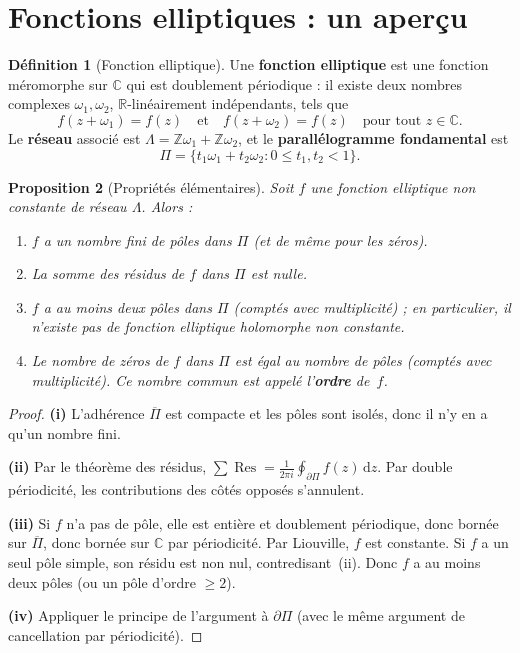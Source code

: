 \documentclass[12pt,a4paper,openany]{book}
\theoremstyle{definition}
\newtheorem{definition}{Définition}[chapter]
\theoremstyle{plain}
\newtheorem{proposition}[definition]{Proposition}
\theoremstyle{remark}
\newcommand{\C}{\mathbb{C}}
\newcommand{\R}{\mathbb{R}}
\newcommand{\Z}{\mathbb{Z}}
\DeclareMathOperator{\Res}{Res}
\newcommand{\dd}{\mathrm{d}}
\begin{document}
\section{Fonctions elliptiques : un aperçu}\label{sec:elliptiques}

\begin{definition}[Fonction elliptique]\label{def:fonction-elliptique}
Une \textbf{fonction elliptique} est une fonction méromorphe sur $\C$ qui est
doublement périodique : il existe deux nombres complexes $\omega_1, \omega_2$,
$\R$-linéairement indépendants, tels que
\[
  f(z + \omega_1) = f(z) \quad \text{et} \quad f(z + \omega_2) = f(z)
  \quad \text{pour tout } z \in \C.
\]
Le \textbf{réseau} associé est $\Lambda = \Z\omega_1 + \Z\omega_2$, et le
\textbf{parallélogramme fondamental} est
\[
  \Pi = \{t_1 \omega_1 + t_2 \omega_2 : 0 \leq t_1, t_2 < 1\}.
\]
\end{definition}

\begin{proposition}[Propriétés élémentaires]\label{prop:elliptiques-elem}
Soit $f$ une fonction elliptique non constante de réseau $\Lambda$. Alors :
\begin{enumerate}[label=(\roman*)]
  \item $f$ a un nombre fini de pôles dans $\Pi$ (et de même pour les zéros).
  \item La somme des résidus de $f$ dans $\Pi$ est nulle.
  \item $f$ a au moins deux pôles dans $\Pi$ (comptés avec multiplicité) ;
    en particulier, il n'existe pas de fonction elliptique holomorphe non
    constante.
  \item Le nombre de zéros de $f$ dans $\Pi$ est égal au nombre de pôles
    (comptés avec multiplicité). Ce nombre commun est appelé l'\textbf{ordre}
    de~$f$.
\end{enumerate}
\end{proposition}

\begin{proof}
\textbf{(i)} L'adhérence $\overline{\Pi}$ est compacte et les pôles sont
isolés, donc il n'y en a qu'un nombre fini.

\textbf{(ii)} Par le théorème des résidus, $\sum \Res = \frac{1}{2\pi i}
\oint_{\partial\Pi} f(z)\,\dd z$. Par double périodicité, les contributions
des côtés opposés s'annulent.

\textbf{(iii)} Si $f$ n'a pas de pôle, elle est entière et doublement périodique,
donc bornée sur $\overline\Pi$, donc bornée sur $\C$ par périodicité. Par
Liouville, $f$ est constante. Si $f$ a un seul pôle simple, son résidu est non
nul, contredisant~(ii). Donc $f$ a au moins deux pôles (ou un pôle d'ordre
$\geq 2$).

\textbf{(iv)} Appliquer le principe de l'argument à $\partial\Pi$ (avec le
même argument de cancellation par périodicité).
\end{proof}
\end{document}

